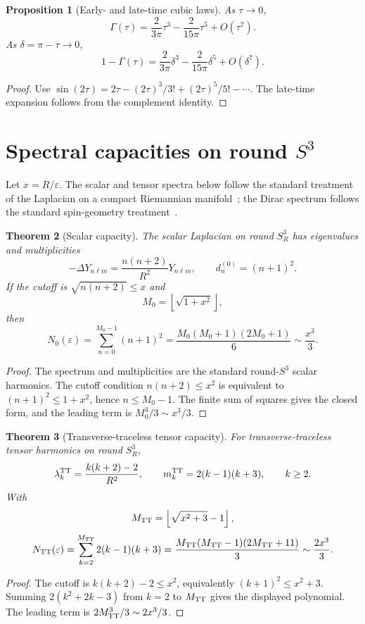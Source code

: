 \documentclass[11pt,a4paper]{article}
\newtheorem{theorem}{Theorem}[section]
\newtheorem{proposition}[theorem]{Proposition}
\begin{document}
\begin{proposition}[Early- and late-time cubic laws]
As $\tau\to0$,
\[
\Gamma(\tau)=\frac{2}{3\pi}\tau^3-\frac{2}{15\pi}\tau^5+O(\tau^7).
\]
As $\delta=\pi-\tau\to0$,
\[
1-\Gamma(\tau)=\frac{2}{3\pi}\delta^3-\frac{2}{15\pi}\delta^5+O(\delta^7).
\]
\end{proposition}
\begin{proof}
Use $\sin(2\tau)=2\tau-(2\tau)^3/3!+(2\tau)^5/5!-\cdots$.  The late-time expansion follows from the complement identity.\end{proof}

\section{Spectral capacities on round $S^3$}

Let $x=R/\varepsilon$.  The scalar and tensor spectra below follow the standard treatment of the Laplacian on a compact Riemannian manifold~\cite{Rosenberg1997}; the Dirac spectrum follows the standard spin-geometry treatment~\cite{LawsonMichelsohn1989}.

\begin{theorem}[Scalar capacity]
The scalar Laplacian on round $S^3_R$ has eigenvalues and multiplicities
\[
-\Delta Y_{n\ell m}=\frac{n(n+2)}{R^2}Y_{n\ell m},
\qquad d_n^{(0)}=(n+1)^2.
\]
If the cutoff is $\sqrt{n(n+2)}\le x$ and
\[
M_0=\left\lfloor\sqrt{1+x^2}\right\rfloor,
\]
then
\[
N_0(\varepsilon)=\sum_{n=0}^{M_0-1}(n+1)^2
=\frac{M_0(M_0+1)(2M_0+1)}{6}
\sim\frac{x^3}{3}.
\]
\end{theorem}
\begin{proof}
The spectrum and multiplicities are the standard round-$S^3$ scalar harmonics.  The cutoff condition $n(n+2)\le x^2$ is equivalent to $(n+1)^2\le1+x^2$, hence $n\le M_0-1$.  The finite sum of squares gives the closed form, and the leading term is $M_0^3/3\sim x^3/3$.\end{proof}

\begin{theorem}[Transverse-traceless tensor capacity]
For transverse-traceless tensor harmonics on round $S^3_R$,
\[
\lambda_k^{\rm TT}=\frac{k(k+2)-2}{R^2},
\qquad
m_k^{\rm TT}=2(k-1)(k+3),
\qquad k\ge2.
\]
With
\[
M_{\rm TT}=\left\lfloor\sqrt{x^2+3}-1\right\rfloor,
\]
\[
N_{\rm TT}(\varepsilon)=\sum_{k=2}^{M_{\rm TT}}2(k-1)(k+3)
=\frac{M_{\rm TT}(M_{\rm TT}-1)(2M_{\rm TT}+11)}{3}
\sim\frac{2x^3}{3}.
\]
\end{theorem}
\begin{proof}
The cutoff is $k(k+2)-2\le x^2$, equivalently $(k+1)^2\le x^2+3$.  Summing $2(k^2+2k-3)$ from $k=2$ to $M_{\rm TT}$ gives the displayed polynomial.  The leading term is $2M_{\rm TT}^3/3\sim2x^3/3$.\end{proof}
\end{document}
